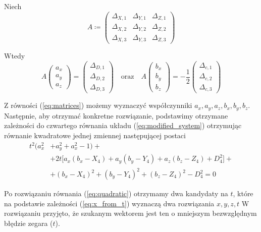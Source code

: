 \documentclass{article}
\begin{document}
Niech
\[
A \coloneqq
\begin{pmatrix}
\Delta_{X,1} & \Delta_{Y,1} & \Delta_{Z, 1} \\
\Delta_{X,2} & \Delta_{Y,2} & \Delta_{Z, 2} \\
\Delta_{X,3} & \Delta_{Y,3} & \Delta_{Z, 3}
\end{pmatrix}
\]

Wtedy
\begin{equation}
    \label{eq:matrices}
    A
    \begin{pmatrix}
        a_x \\ a_y \\ a_z
    \end{pmatrix}
    =
    \begin{pmatrix}
        \Delta_{D, 1} \\ \Delta_{D, 2} \\ \Delta_{D, 3}
    \end{pmatrix}
    \quad \textrm{oraz} \quad
    A
    \begin{pmatrix}
        b_x \\ b_y \\ b_z
    \end{pmatrix}
    =
    -\frac{1}{2}
    \begin{pmatrix}
        \Delta_{c, 1} \\
        \Delta_{c, 2} \\
        \Delta_{c, 3}
    \end{pmatrix}
\end{equation}

Z równości (\ref{eq:matrices}) możemy wyznaczyć współczynniki $a_x, a_y, a_z, b_x, b_y, b_z$.
Następnie, aby otrzymać konkretne rozwiązanie, podstawimy otrzymane zależności do czwartego równania układu
(\ref{eq:modified_system}) otrzymując równanie kwadratowe jednej zmiennej następującej postaci
\begin{equation} \label{eq:quadratic}
\begin{split}
  t^2(a_x^2&+a_y^2+a_x^2-1) + \\
  &+ 2t\big[ a_x(b_x-X_4)+a_y(b_y-Y_4)+a_z(b_z-Z_4)+D_4^2\big] + \\
  &+ (b_x-X_4)^2+(b_y-Y_4)^2+(b_z-Z_4)^2-D_4^2 = 0
\end{split}
\end{equation}

Po rozwiązaniu równania (\ref{eq:quadratic}) otrzymamy dwa kandydaty na $t$, które
na podstawie zależności (\ref{eq:x_from_t}) wyznaczą dwa rozwiązania $x, y, z, t$
W rozwiązaniu przyjęto, że szukanym wektorem jest ten o mniejszym bezwzględnym błędzie zegara ($t$).
\end{document}
